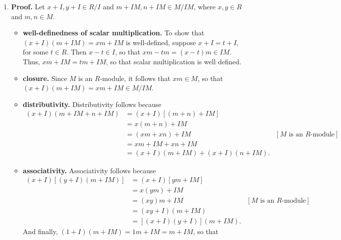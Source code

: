 \documentclass[9pt]{article}
\begin{document}
\begin{enumerate}
      \begin{enumerate}
         \item \textbf{Proof.} Let $x + I, y + I \in R/I$ and
               $m + IM, n + IM \in M/IM$, where $x, y \in R$ and $m, n \in M$.
               \begin{itemize}
                  \item \textbf{well-definedness of scalar multiplication.} To
                        show that $(x+I)(m+IM) = xm + IM$ is well-defined,
                        suppose $x + I = t + I$, for some $t \in R$. Then
                        $x - t \in I$, so that $xm - tm = (x-t)m \in IM$. Thus,
                        $xm + IM = tm + IM$, so that scalar multiplication is
                        well defined.
                  \item \textbf{closure.} Since $M$ is an $R$-module, it follows
                        that $xm \in M$, so that
                        $(x+I)(m+IM) = xm + IM \in M/IM$.
                  \item \textbf{distributivity.} Distributivity follows because
                        \begin{align*}
                           (x+I)(m+IM +n+IM) &= (x+I)[(m+n)+IM] \\
                              &= x(m+n) + IM \\
                              &= (xm + xn) + IM
                                 &[M \text{ is an } R\text{-module}] \\
                              &= xm + IM + xn + IM \\
                              &= (x+I)(m+IM) + (x+I)(n+IM).
                        \end{align*}
                  \item \textbf{associativity.} Associativity follows because
                        \begin{align*}
                           (x+I)[(y+I)(m+IM)] &= (x+I)[ym+IM] \\
                              &= x(ym) + IM \\
                              &= (xy)m + IM
                                 &[M \text{ is an } R\text{-module}] \\
                              &= (xy+I)(m+IM) \\
                              &= [(x+I)(y+I)](m+IM).
                        \end{align*}
                  And finally, $(1 + I)(m+IM) = 1m + IM = m + IM$, so that

\end{itemize}
\end{enumerate}
\end{enumerate}
\end{document}

